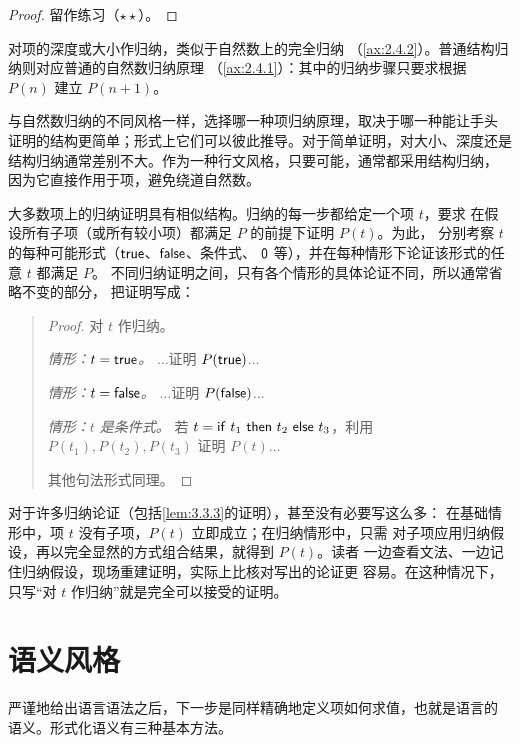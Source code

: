 \begin{proof}
留作练习（\(\star\star\)）。
\end{proof}

对项的深度或大小作归纳，类似于自然数上的完全归纳
（\cref{ax:2.4.2}）。普通结构归纳则对应普通的自然数归纳原理
（\cref{ax:2.4.1}）：其中的归纳步骤只要求根据 \(P(n)\) 建立
\(P(n+1)\)。

与自然数归纳的不同风格一样，选择哪一种项归纳原理，取决于哪一种能让手头
证明的结构更简单；形式上它们可以彼此推导。对于简单证明，对大小、深度还是
结构归纳通常差别不大。作为一种行文风格，只要可能，通常都采用结构归纳，
因为它直接作用于项，避免绕道自然数。

大多数项上的归纳证明具有相似结构。归纳的每一步都给定一个项 \(t\)，要求
在假设所有子项（或所有较小项）都满足 \(P\) 的前提下证明 \(P(t)\)。为此，
分别考察 \(t\) 的每种可能形式（\(\mathsf{true}\)、\(\mathsf{false}\)、条件式、
\(\mathsf{0}\) 等），并在每种情形下论证该形式的任意 \(t\) 都满足 \(P\)。
不同归纳证明之间，只有各个情形的具体论证不同，所以通常省略不变的部分，
把证明写成：
\begin{quote}
\begin{proof}
对 \(t\) 作归纳。

\emph{情形：\(t=\mathsf{true}\)。}\quad
\(\ldots\)证明 \(P(\mathsf{true})\)\(\ldots\)

\emph{情形：\(t=\mathsf{false}\)。}\quad
\(\ldots\)证明 \(P(\mathsf{false})\)\(\ldots\)

\emph{情形：\(t\) 是条件式。}\quad
若 \(t=\mathsf{if}\ t_1\ \mathsf{then}\ t_2\ \mathsf{else}\ t_3\)，利用 \(P(t_1),P(t_2),P(t_3)\)
证明 \(P(t)\)\(\ldots\)

其他句法形式同理。
\end{proof}
\end{quote}

对于许多归纳论证（包括\cref{lem:3.3.3}的证明），甚至没有必要写这么多：
在基础情形中，项 \(t\) 没有子项，\(P(t)\) 立即成立；在归纳情形中，只需
对子项应用归纳假设，再以完全显然的方式组合结果，就得到 \(P(t)\)。读者
一边查看文法、一边记住归纳假设，现场重建证明，实际上比核对写出的论证更
容易。在这种情况下，只写“对 \(t\) 作归纳”就是完全可以接受的证明。

\section{语义风格}
\label{sec:3.4}

严谨地给出语言语法之后，下一步是同样精确地定义项如何求值，也就是语言的
语义。形式化语义有三种基本方法。

